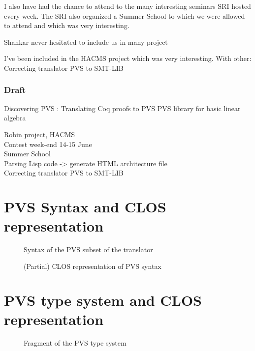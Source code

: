 \documentclass[12pt,a4paper,titlepage]{article}
\begin{document}
I also have had the chance to attend to the many interesting seminars SRI hosted every week.
The SRI also organized a Summer School to which we were allowed to attend and which was very interesting.

Shankar never hesitated to include us in many project

I've been included in the HACMS project which was very interesting.
With other:
Correcting translator PVS to SMT-LIB




\subsubsection*{Draft}
Discovering PVS :
Translating Coq proofs to PVS
PVS library for basic linear algebra

Robin project, HACMS \\
Contest week-end 14-15 June \\
Summer School \\
Parsing Lisp code -> generate HTML architecture file\\
Correcting translator PVS to SMT-LIB
\cite{pavol}












\appendix

\newpage
\section{PVS Syntax and CLOS representation}

\begin{figure}[h]

\caption{Syntax of the PVS subset of the translator}
\label{fig:PVSsyntax}
\end{figure}

\begin{figure}[h!]

\caption{(Partial) CLOS representation of PVS syntax}
\label{fig:PVS-CLOS}
\end{figure}

\newpage
\section{PVS type system and CLOS representation}

\begin{figure}[h!]

\caption{Fragment of the PVS type system}
\label{fig:PVS-types}
\end{figure}
\end{document}
